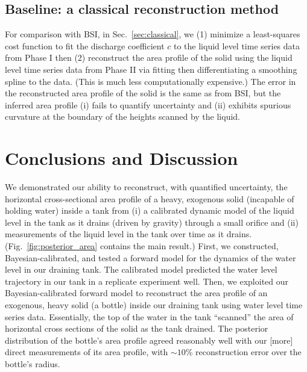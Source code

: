 \documentclass[a4paper,fleqn]{cas-dc}
\begin{document}
\subsection{Baseline: a classical reconstruction method}
For comparison with BSI, in Sec.~\ref{sec:classical}, we (1) minimize a least-squares cost function to fit the discharge coefficient $c$ to the liquid level time series data from Phase I then (2) reconstruct the area profile of the solid using the liquid level time series data from Phase II via fitting then differentiating a smoothing spline to the data. (This is much less computationally expensive.)
The error in the reconstructed area profile of the solid is the same as from BSI, but the inferred area profile (i) fails to quantify uncertainty and (ii) exhibits spurious curvature at the boundary of the heights scanned by the liquid.


\section{Conclusions and Discussion}
We demonstrated our ability to reconstruct, with quantified uncertainty, the horizontal cross-sectional area profile of a heavy, exogenous solid (incapable of holding water) inside a tank from (i) a calibrated dynamic model of the liquid level in the tank as it drains (driven by gravity) through a small orifice and (ii) measurements of the liquid level in the tank over time as it drains.
(Fig.~\ref{fig:posterior_area} contains the main result.)
First, we constructed, Bayesian-calibrated, and tested a forward model for the dynamics of the water level in our draining tank.
The calibrated model predicted the water level trajectory in our tank in a replicate experiment well.
Then, we exploited our Bayesian-calibrated forward model to reconstruct the area profile of an exogenous, heavy solid (a bottle) inside our draining tank using water level time series data. 
Essentially, the top of the water in the tank ``scanned'' the area of horizontal cross sections of the solid as the tank drained. 
The posterior distribution of the bottle's area profile agreed reasonably well with our [more] direct measurements of its area profile, with $\sim 10$\% reconstruction error over the bottle's radius. 
\end{document}
